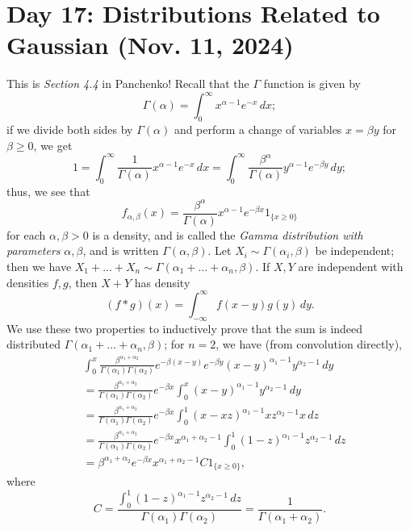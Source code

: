 \section{Day 17: Distributions Related to Gaussian (Nov. 11, 2024)}
This is \textit{Section 4.4} in Panchenko! Recall that the $\Gamma$ function is given by
\[ \Gamma(\alpha) = \int_0^\infty x^{\alpha - 1} e^{-x} \, dx; \]
if we divide both sides by $\Gamma(\alpha)$ and perform a change of variables $x = \beta y$ for $\beta \geq 0$, we get
\[ 1 = \int_0^{\infty} \frac{1}{\Gamma(\alpha)} x^{\alpha - 1}e^{-x} \, dx = \int_0^{\infty} \frac{\beta^\alpha}{\Gamma(\alpha)} y^{\alpha - 1} e^{-\beta y} \, dy; \]
thus, we see that
\[ f_{\alpha, \beta}(x) = \frac{\beta^\alpha}{\Gamma(\alpha)} x^{\alpha - 1} e^{- \beta x} 1_{\{x \geq 0\}} \]
for each $\alpha, \beta > 0$ is a density, and is called the \textit{Gamma distribution with parameters} $\alpha, \beta$, and is written $\Gamma(\alpha, \beta)$. Let $X_i \sim \Gamma(\alpha_i, \beta)$ be independent; then we have $X_1 + \dots + X_n \sim \Gamma(\alpha_1 + \dots + \alpha_n, \beta)$. If $X, Y$ are independent with densities $f, g$, then $X + Y$ has density
\[ (f \ast g)(x) = \int_{-\infty}^\infty f(x - y)g(y) \, dy. \]
We use these two properties to inductively prove that the sum is indeed distributed $\Gamma(\alpha_1 + \dots + \alpha_n, \beta)$; for $n = 2$, we have (from convolution directly),
\begin{align*}
    & \int_0^x \frac{\beta^{\alpha_1 + \alpha_2}}{\Gamma(\alpha_1) \Gamma(\alpha_2)} e^{-\beta(x - y)} e^{- \beta y} (x - y)^{\alpha_1 - 1} y^{\alpha_2 - 1} \, dy \\
    &= \frac{\beta^{\alpha_1 + \alpha_2}}{\Gamma(\alpha_1) \Gamma(\alpha_2)} e^{-\beta x} \int_0^x (x - y)^{\alpha_1 - 1} y^{\alpha_2 - 1} \, dy \tag{Substitute $y = xz$} \\
    &= \frac{\beta^{\alpha_1 + \alpha_2}}{\Gamma(\alpha_1) \Gamma(\alpha_2)} e^{-\beta x} \int_0^1 (x - xz)^{\alpha_1 - 1} xz^{\alpha_2 - 1} x \, dz \\
    &= \frac{\beta^{\alpha_1 + \alpha_2}}{\Gamma(\alpha_1) \Gamma(\alpha_2)} e^{-\beta x} x^{\alpha_1 + \alpha_2 - 1} \int_0^1 (1 - z)^{\alpha_1 - 1} z^{\alpha_2 - 1} \, dz \\
    &= \beta^{\alpha_1 + \alpha_2} e^{-\beta x} x^{\alpha_1 + \alpha_2 - 1} C 1_{\{x \geq 0\}},
\end{align*}
where
\[ C = \frac{\int_0^1 (1 - z)^{\alpha_1 - 1} z^{\alpha_2 - 1} \, dz}{\Gamma(\alpha_1) \Gamma(\alpha_2)} = \frac{1}{\Gamma(\alpha_1 + \alpha_2)}. \]
